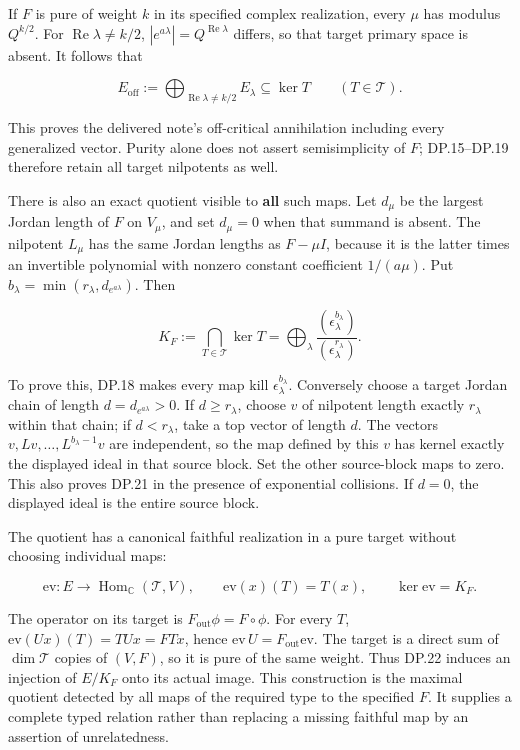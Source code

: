 If \(F\) is pure of weight \(k\) in its specified complex realization, every \(\mu\) has modulus \(Q^{k/2}\). For \(\operatorname{Re}\lambda\ne k/2\), \(|e^{a\lambda}|=Q^{\operatorname{Re}\lambda}\) differs, so that target primary space is absent. It follows that

\[
E_{\mathrm{off}}:=\bigoplus_{\operatorname{Re}\lambda\ne k/2}E_\lambda
\subseteq\ker T
\qquad(T\in\mathscr T).
\tag{DP.20}
\]

This proves the delivered note's off-critical annihilation including every generalized vector. Purity alone does not assert semisimplicity of \(F\); DP.15--DP.19 therefore retain all target nilpotents as well.

There is also an exact quotient visible to \textbf{all} such maps. Let \(d_\mu\) be the largest Jordan length of \(F\) on \(V_\mu\), and set \(d_\mu=0\) when that summand is absent. The nilpotent \(L_\mu\) has the same Jordan lengths as \(F-\mu I\), because it is the latter times an invertible polynomial with nonzero constant coefficient \(1/(a\mu)\). Put \(b_\lambda=\min(r_\lambda,d_{e^{a\lambda}})\). Then

\[
K_F:=\bigcap_{T\in\mathscr T}\ker T
=\bigoplus_\lambda
 \frac{(\epsilon_\lambda^{b_\lambda})}
      {(\epsilon_\lambda^{r_\lambda})}.
\tag{DP.21}
\]

To prove this, DP.18 makes every map kill \(\epsilon_\lambda^{b_\lambda}\). Conversely choose a target Jordan chain of length \(d=d_{e^{a\lambda}}>0\). If \(d\ge r_\lambda\), choose \(v\) of nilpotent length exactly \(r_\lambda\) within that chain; if \(d<r_\lambda\), take a top vector of length \(d\). The vectors \(v,Lv,\ldots,L^{b_\lambda-1}v\) are independent, so the map defined by this \(v\) has kernel exactly the displayed ideal in that source block. Set the other source-block maps to zero. This also proves DP.21 in the presence of exponential collisions. If \(d=0\), the displayed ideal is the entire source block.

The quotient has a canonical faithful realization in a pure target without choosing individual maps:

\[
\mathrm{ev}:E\longrightarrow
 \operatorname{Hom}_{\mathbb C}(\mathscr T,V),
\qquad \mathrm{ev}(x)(T)=T(x),
\qquad \ker\mathrm{ev}=K_F.
\tag{DP.22}
\]

The operator on its target is \(F_{\mathrm{out}}\phi=F\circ\phi\). For every \(T\), \(\mathrm{ev}(Ux)(T)=TUx=FTx\), hence \(\mathrm{ev}\,U=F_{\mathrm{out}}\mathrm{ev}\). The target is a direct sum of \(\dim\mathscr T\) copies of \((V,F)\), so it is pure of the same weight. Thus DP.22 induces an injection of \(E/K_F\) onto its actual image. This construction is the maximal quotient detected by all maps of the required type to the specified \(F\). It supplies a complete typed relation rather than replacing a missing faithful map by an assertion of unrelatedness.


